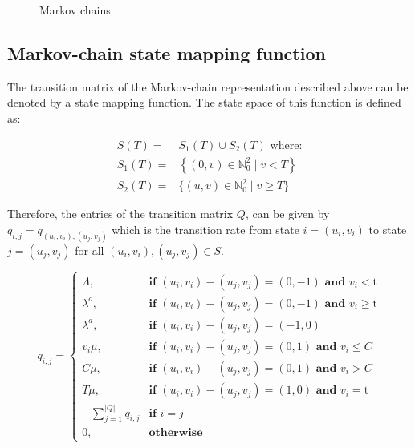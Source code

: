 \begin{figure}[h]
    \caption{Markov chains} 
    \label{markov_model}
\end{figure}

\subsection{Markov-chain state mapping function}
The transition matrix of the Markov-chain representation described above can be denoted by a state mapping function. The state space of this function is defined as:



\begin{align}
    S(T) =& S_1(T) \cup S_2(T) \text{ where:} \nonumber \\
    S_1(T) =& \left\{(0, v)\in\mathbb{N}_0^2 \; | \; v < T \right\} \\
    S_2(T) =& \{(u, v)\in\mathbb{N}_0^2 \; | \; v \geq T \} \nonumber
\end{align}

Therefore, the entries of the transition matrix \(Q\), can be given by \( q_{i,j} = q_{(u_i, v_i),(u_j, v_j)} \) which is the transition rate from state \( i = (u_i, v_i) \) to state \( j = (u_j , v_j) \) for all \( (u_i, v_i), (u_j, v_j) \in S \).

\begin{equation}
    q_{i, j} = 
    \begin{cases}
        \Lambda, & \textbf{if } (u_i, v_i) - (u_j, v_j) = (0,-1) \textbf{ and } v_i < \text{t} \\
        \lambda^o, & \textbf{if } (u_i, v_i) - (u_j, v_j) = (0,-1) \textbf{ and } v_i \geq \text{t} \\
        \lambda^a, & \textbf{if } (u_i, v_i) - (u_j, v_j) = (-1,0) \\
        v_i \mu, & \textbf{if } (u_i, v_i) - (u_j, v_j) = (0,1) \textbf{ and } v_i \leq C\\
        C \mu, & \textbf{if } (u_i, v_i) - (u_j, v_j) = (0,1) \textbf{ and } v_i > C \\
        T \mu, & \textbf{if } (u_i, v_i) - (u_j, v_j) = (1,0) \textbf{ and } v_i = \text{t} \\
        -\sum_{j=1}^{|Q|}{q_{i,j}} & \textbf{if } i = j \\
        0, & \textbf{otherwise}
    \end{cases}
\end{equation}

